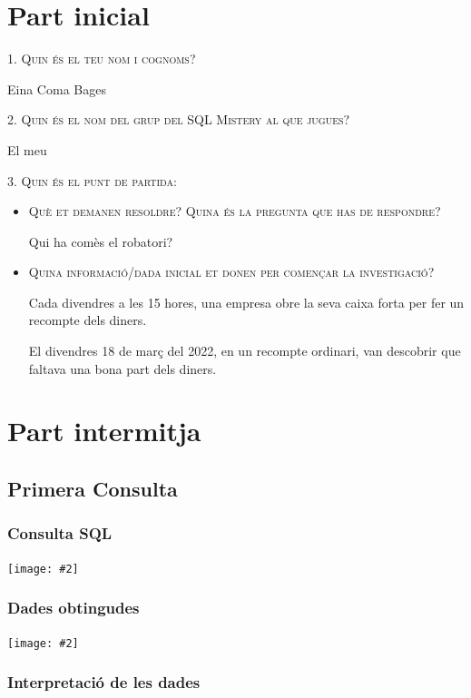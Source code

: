 \documentclass[a4paper,12pt]{article}
\newcommand{\mygraphic}[2][width=\textwidth]{\begin{center}
		\centering\texttt{[image: \#2]}\par
\end{center}}
\begin{document}

\section{Part inicial}
\textsc{1. Quin és el teu nom i cognoms?}

Eina Coma Bages

\textsc{2. Quin és el nom del grup del SQL Mistery al que jugues?}

El meu 

\textsc{3. Quin és el punt de partida:}
\begin{itemize}
	\item \textsc{Què et demanen resoldre? Quina és la pregunta que has de respondre?}
	
	Qui ha comès el robatori?	

	\item \textsc{Quina informació/dada inicial et donen per començar la investigació?}

	Cada divendres a les 15 hores, una empresa obre la seva caixa forta per fer un recompte dels diners.

	El divendres 18 de març del 2022, en un recompte ordinari, van descobrir que faltava una bona part dels diners.
	
\end{itemize}

\newpage
\section{Part intermitja}

\subsection{Primera Consulta}

\subsubsection{Consulta SQL}
\mygraphic{imatges/1.png}

\subsubsection{Dades obtingudes}
\mygraphic{imatges/2.png}

\subsubsection{Interpretació de les dades}
\end{document}
